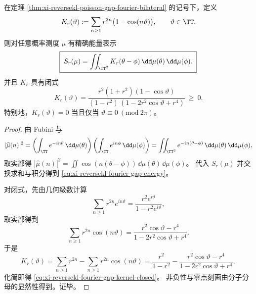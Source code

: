 \begin{proposition}\label{prop:xi-reversekl-fourier-gap-positive-kernel-energy}
在定理 \ref{thm:xi-reversekl-poisson-gap-fourier-bilateral} 的记号下，定义
\[
K_r(\vartheta):=\sum_{n\ge 1} r^{2n}\bigl(1-\cos(n\vartheta)\bigr),\qquad \vartheta\in\TT.
\]
则对任意概率测度 \(\mu\) 有精确能量表示
\begin{equation}\label{eq:xi-reversekl-fourier-gap-energy}
\boxed{\;
S_r(\mu)=\iint_{\TT^2}K_r(\theta-\phi)\,\dd\mu(\theta)\,\dd\mu(\phi).\;}
\end{equation}
并且 \(K_r\) 具有闭式
\begin{equation}\label{eq:xi-reversekl-fourier-gap-kernel-closed}
\boxed{\;
K_r(\vartheta)=\frac{r^2(1+r^2)(1-\cos\vartheta)}{(1-r^2)\,(1-2r^2\cos\vartheta+r^4)}\ \ge\ 0.\;}
\end{equation}
特别地，\(K_r(\vartheta)=0\) 当且仅当 \(\vartheta\equiv 0\ (\mathrm{mod}\ 2\pi)\)。
\end{proposition}
\begin{proof}
由 Fubini 与
\[
|\widehat\mu(n)|^2
=\left(\int_{\TT}e^{-in\theta}\,\dd\mu(\theta)\right)\left(\int_{\TT}e^{in\phi}\,\dd\mu(\phi)\right)
=\iint_{\TT^2}e^{-in(\theta-\phi)}\,\dd\mu(\theta)\,\dd\mu(\phi),
\]
取实部得
\(
|\widehat\mu(n)|^2=\iint\cos(n(\theta-\phi))\,\dd\mu(\theta)\,\dd\mu(\phi)
\)。
代入 \(S_r(\mu)\) 并交换求和与积分得到 \eqref{eq:xi-reversekl-fourier-gap-energy}。
\par
对闭式，先由几何级数计算
\[
\sum_{n\ge 1}r^{2n}e^{in\vartheta}
=\frac{r^2e^{i\vartheta}}{1-r^2e^{i\vartheta}},
\]
取实部得到
\[
\sum_{n\ge 1}r^{2n}\cos(n\vartheta)
=\frac{r^2\cos\vartheta-r^4}{1-2r^2\cos\vartheta+r^4}.
\]
于是
\[
K_r(\vartheta)
=\sum_{n\ge 1}r^{2n}-\sum_{n\ge 1}r^{2n}\cos(n\vartheta)
=\frac{r^2}{1-r^2}-\frac{r^2\cos\vartheta-r^4}{1-2r^2\cos\vartheta+r^4},
\]
化简即得 \eqref{eq:xi-reversekl-fourier-gap-kernel-closed}。
非负性与零点刻画由分子分母的显然性得到。证毕。
\end{proof}

